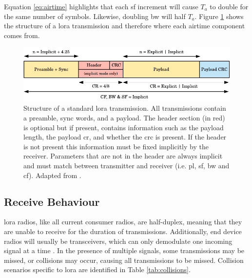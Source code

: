 Equation \ref{eq:airtime} highlights that each \ac{sf} increment will cause $T_a$ to double for the same  number of symbols. Likewise, doubling \ac{bw} will half $T_a$. Figure \ref{lora_transmission_structure} shows the structure of a \ac{lora} transmission and therefore where each airtime component comes from. 

\begin{figure}[H]
    \centering
   	\includegraphics{Figures/lora_transmission.pdf}
    \caption[\ac{lora} transmission packet structure]{
    Structure of a standard \ac{lora} transmission. All transmissions contain a preamble, sync words, and a payload. The header section (in red) is optional but if present, contains information such as the payload length, the payload \ac{cr}, and whether the \ac{crc} is present. If the header is not present this information must be fixed implicitly by the receiver. Parameters that are not in the header are always implicit and must match between transmitter and receiver (i.e. \ac{pl}, \ac{sf}, \ac{bw} and \ac{cf}). Adapted from \cite{3YP:LORA_SX12}.
    }
    \label{lora_transmission_structure}
\end{figure}


\subsection{Receive Behaviour}
\label{sec:lora_considerations}
\ac{lora} radios, like all current consumer radios, are half-duplex, meaning that they are unable to receive for the duration of transmissions. Additionally, end device radios will usually be transceivers, which can only demodulate one incoming signal at a time \cite{3YP:LORA_SX12}. In the presence of multiple signals, some transmissions may be missed, or collisions may occur, causing all transmissions to be missed. Collision scenarios specific to \ac{lora} are identified in Table \ref{tab:collisions}. 

